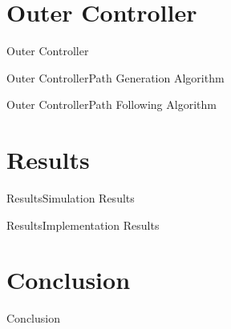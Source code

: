 \section{Outer Controller}

\begin{frame}{Outer Controller}{}

\end{frame}

\begin{frame}{Outer Controller}{Path Generation Algorithm}
    
\end{frame}

\begin{frame}{Outer Controller}{Path Following Algorithm}
    
\end{frame}

\section{Results}

\begin{frame}{Results}{Simulation Results}
    
\end{frame}

\begin{frame}{Results}{Implementation Results}
    
\end{frame}

\section{Conclusion}

\begin{frame}{Conclusion}{}
    
\end{frame}